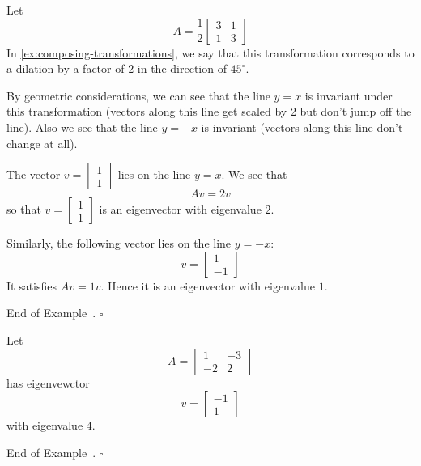 \documentclass[10pt]{article}
\theoremstyle{definition}
\newtheorem{example}[theorem]{Example}
\renewenvironment{example}
{\begin{oldexample}}
  {\par\smallskip\hfill   End of Example~\theexample. $\square$    \par\end{oldexample}}
\begin{document}
\begin{example}
  Let
  \begin{equation*}
    A=\frac{1}{2}
    \begin{bmatrix}
      3&1\\1&3
    \end{bmatrix}
  \end{equation*}
  In \cref{ex:composing-transformations}, we say that this transformation
  corresponds to a dilation by a factor of $2$ in the direction of
  $45^{\circ}.$

  By geometric considerations, we can see that the line $y=x$ is invariant
  under this transformation (vectors along this line get scaled by 2 but don't
  jump off the line). Also we see that the line $y=-x$ is invariant (vectors
  along this line don't change at all).

  The vector $v =
  \begin{bmatrix}
    1\\1
  \end{bmatrix}
  $
  lies on the line $y=x$. We see that
  \begin{equation*}
    Av = 2v
  \end{equation*}
  so that $v=
  \begin{bmatrix}
    1\\1
  \end{bmatrix}
  $ is an eigenvector with eigenvalue $2$.

  Similarly, the following vector lies on the line $y=-x$:
  \begin{equation*}
    v=
    \begin{bmatrix}
      1\\-1
    \end{bmatrix}
  \end{equation*}
  It satisfies $Av=1v$. Hence it is an eigenvector with eigenvalue $1$.
\end{example}

\begin{example}
  Let
  \begin{equation*}
    A=
    \begin{bmatrix}
      1&-3\\
      -2&2
    \end{bmatrix}
  \end{equation*}
  has eigenvewctor
  \begin{equation*}
    v=
    \begin{bmatrix}
      -1\\1
    \end{bmatrix}
  \end{equation*}
  with eigenvalue $4$.
\end{example}
\end{document}
